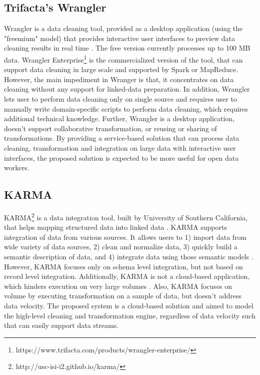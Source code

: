 \subsection{Trifacta's Wrangler}
Wrangler is a data cleaning tool, provided as a desktop application (using the "freemium" model) that provides interactive user interfaces to preview data cleaning results in real time \cite{2011-wrangler,visualizationsandtransformationsinwrangling,Keim08visualanalytics:}. The free version currently processes up to 100 MB data. Wrangler Enterprise\footnote{https://www.trifacta.com/products/wrangler-enterprise/} is the commercialized version of the tool, that can support data cleaning in large scale and supported by Spark or MapReduce. However, the main impediment in Wranger is that, it concentrates on data cleaning without any support for linked-data preparation. In addition, Wrangler lets user to perform data cleaning only on single source and requires user to manually write domain-specific scripts to perform data cleaning, which requires additional technical knowledge. Further, Wrangler is a desktop application, doesn't support collaborative transformation, or reusing or sharing of transformations. By providing a service-based solution that can process data cleaning, transformation and integration on large data with interactive user interfaces, the proposed solution is expected to be more useful for open data workers. 
\subsection{KARMA}
KARMA\footnote{http://usc-isi-i2.github.io/karma/} is a data integration tool, built by University of Southern California, that helps mapping structured data into linked data \cite{karma}. KARMA supports integration of data from various sources. It allows users to 1) import data from wide variety of data sources, 2) clean and normalize data, 3) quickly build a semantic description of data, and  4) integrate data using those semantic models \cite{knoblock15:aimag}. However, KARMA focuses only on schema level integration, but not based on record level integration. Additionally, KARMA is not a cloud-based application, which hinders execution on very large volumes \cite{knoblock15:aimag}. Also, KARMA focuses on volume by executing transformation on a sample of data, but doesn't address data velocity. The proposed system is a cloud-based solution and aimed to model the high-level cleaning and transformation engine, regardless of data velocity such that can easily support data streams. 
